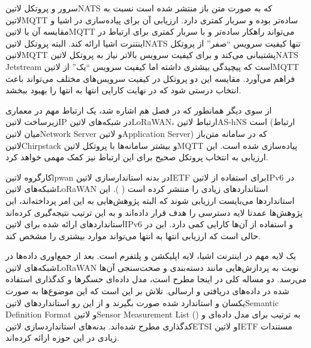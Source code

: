 سرور و پروتکل ‌لاتین{NATS} که به صورت متن باز منتشر شده است نسبت به ‌لاتین{MQTT} ساده‌تر بوده و سربار کمتری دارد. ارزیابی آن
برای پیاده‌سازی در اشیا و مقایسه آن با ‌لاتین{MQTT} می‌تواند راهکار ساده‌تر و با سربار کمتری برای ارتباط در اینتنرت اشیا ارائه کند.
البته پروتکل ‌لاتین{NATS} تنها کیفیت سرویس ``صفر'' از پروتکل ‌لاتین{MQTT} پشتیبانی می‌کند و برای کیفیت سرویس بالاتر نیاز به
پروتکل ‌لاتین{NATS Jetstream} است که پیچیدگی بیشتری داشته اما کیفیت سرویس ``یک'' از ‌لاتین{MQTT} فراهم می‌آورد.
مقایسه این دو پروتکل در کیفیت سرویس‌های مختلف می‌تواند باعث انتخاب درستی شود که در نهایت کارایی انتها به انتها را بهبود ببخشد.

از سوی دیگر همانطور که در فصل  هم اشاره شد، یک ارتباط مهم در معماری زیرساخت ‌لاتین{IP} در شبکه‌های ‌لاتین{LoRaWAN}،
ارتباط ‌لاتین{AS-hNS} است (ارتباط میان ‌لاتین{Network Server} و ‌لاتین{Application Server})
که در سامانه متن‌باز ‌لاتین{Chirpstack} و بیشتر سامانه‌ها با پروتکل ‌لاتین{MQTT} پیاده‌سازی شده است.
این ارزیابی به انتخاب پروتکل صحیح برای این ارتباط نیز کمک مهمی خواهد کرد.


کارگروه ‌لاتین{lpwan} در بدنه استاندارسازی ‌لاتین{IETF} برای استفاده از ‌لاتین{IPv6} در شبکه‌های ‌لاتین{LoRaWAN} استانداردهای زیادی را منتشر کرده است ( ).
این استانداردها می‌بایست ارزیابی شوند که البته پژوهش‌هایی به این امر پرداخته‌اند،
این پژوهش‌ها عمدتا لایه دسترسی را هدف قرار داده‌اند و به این ترتیب نتیجه‌گیری کرده‌اند استانداردهای
ارائه شده برای ‌لاتین{IPv6} و استفاده از آن‌ها کارایی کمی دارد. این در حالی است که ارزیابی انتها
به انتها می‌تواند موارد بیشتری را مشخص کند.


یک لایه مهم در اینترنت اشیا، لایه اپلیکشن و پلتفرم است. بعد از جمع‌اوری داده‌ها در شبکه‌های ‌لاتین{LoRaWAN} نوبت به پردازش‌هایی مانند دسته‌بندی و صحت‌سنجی
آن‌ها می‌رسد. دو مساله کلی در اینجا مطرح است،
مدل داده‌ای حسگرها و کدگذاری استفاده شده در داده‌های دریافتی و ارسالی.
تلاش بر این است که این موضوع‌ها به صورت یکسان و استاندارد شده صورت بگیرند و از این رو استانداردهای
‌لاتین{Semantic Definition Format} و ‌لاتین{Sensor Measurement List} ()
به ترتیب برای مدل داده‌ای و کدگذاری مطرح شده‌اند.
بدنه‌های استانداردسازی ‌لاتین{ETSI} و ‌لاتین{IETF} مستندات زیادی در این حوزه ارائه کرده‌اند.

